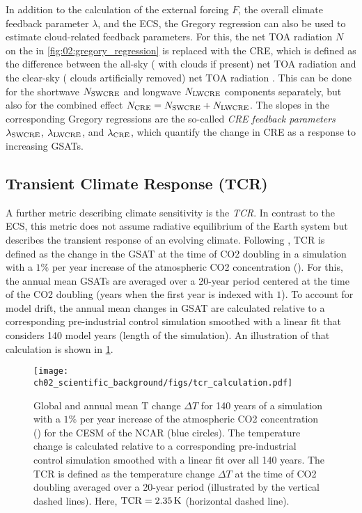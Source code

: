 In addition to the calculation of the external forcing $F$, the overall climate
feedback parameter $\lambda$, and the \ac{ECS}, the Gregory regression can also
be used to estimate cloud-related feedback parameters. For this, the net
\ac{TOA} radiation $N$ on the \yaxis{} in \cref{fig:02:gregory_regression} is
replaced with the \ac{CRE}, which is defined as the difference between the
all-sky (\ie{} with clouds if present) net \ac{TOA} radiation and the clear-sky
(\ie{} clouds artificially removed) net \ac{TOA} radiation
\autocite{Andrews2012}. This can be done for the shortwave $N_\mathtxt{SWCRE}$
and longwave $N_\mathtxt{LWCRE}$ components separately, but also for the
combined effect $N_\mathtxt{CRE} = N_\mathtxt{SWCRE} + N_\mathtxt{LWCRE}$. The
slopes in the corresponding Gregory regressions are the so-called
\emph{\ac{CRE} feedback parameters} $\lambda_\mathtxt{SWCRE}$,
$\lambda_\mathtxt{LWCRE}$, and $\lambda_\mathtxt{CRE}$, which quantify the
change in \ac{CRE} as a response to increasing \acp{GSAT}.


\subsection{Transient Climate Response (\acs{TCR})}
\label{subsec:02:tcr}

A further metric describing climate sensitivity is the \emph{\ac{TCR}}. In
contrast to the \ac{ECS}, this metric does not assume radiative equilibrium of
the Earth system but describes the transient response of an evolving climate.
Following \textcite{Bindoff2013}, \ac{TCR} is defined as the change in the
\ac{GSAT} at the time of \ac{CO2} doubling in a simulation with a $1 \unit{\%}$
per year increase of the atmospheric \ac{CO2} concentration (\onepctcotwo{}).
For this, the annual mean \acp{GSAT} are averaged over a 20-year period
centered at the time of the \ac{CO2} doubling (years  when the
first year is indexed with $1$). To account for model drift, the annual mean
changes in \ac{GSAT} are calculated relative to a corresponding pre-industrial
control simulation smoothed with a linear fit that considers 140 model years
(length of the \onepctcotwo{} simulation). An illustration of that calculation
is shown in \cref{fig:02:tcr}.

\begin{figure}[t]
  \centering
  \texttt{[image: 
    ch02\_scientific\_background/figs/tcr\_calculation.pdf]}
  \caption[
    Illustration of the definition of the \acf{TCR}.
  ]{
    Global and annual mean \acl{T} change $\Delta T$ for 140 years of a
    simulation with a $1 \unit{\%}$ per year increase of the atmospheric
    \acs{CO2} concentration (\onepctcotwo{}) for the \acf{CESM} of the
    \acf{NCAR} (blue circles). The temperature change is calculated relative to
    a corresponding pre-industrial control simulation smoothed with a linear
    fit over all 140 years. The \acf{TCR} is defined as the temperature change
    $\Delta T$ at the time of \acs{CO2} doubling averaged over a 20-year period
    (illustrated by the vertical dashed lines). Here, $\mathtxt{TCR} = 2.35
    \unit{K}$ (horizontal dashed line).
  }
  \label{fig:02:tcr}
\end{figure}

